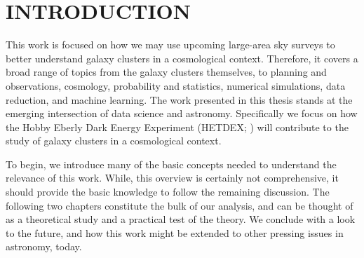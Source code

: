%
%
%



\pagestyle{plain} %
\setcounter{page}{1}


\chapter[\uppercase{Introduction}]{\uppercase{Introduction}}

This work is focused on how we may use upcoming large-area sky surveys to better understand galaxy clusters in a cosmological context. Therefore, it covers a broad range of topics from the galaxy clusters themselves, to planning and observations, cosmology, probability and statistics, numerical simulations, data reduction, and machine learning. The work presented in this thesis stands at the emerging intersection of data science and astronomy. Specifically we focus on how the Hobby Eberly Dark Energy Experiment (HETDEX; \citealt{Hill2008}) will contribute to the study of galaxy clusters in a cosmological context.

To begin, we introduce many of the basic concepts needed to understand the relevance of this work. While, this overview is certainly not comprehensive, it should provide the basic knowledge to follow the remaining discussion. The following two chapters constitute the bulk of our analysis, and can be thought of as a theoretical study and a practical test of the theory. We conclude with a look to the future, and how this work might be extended to other pressing issues in astronomy, today.

